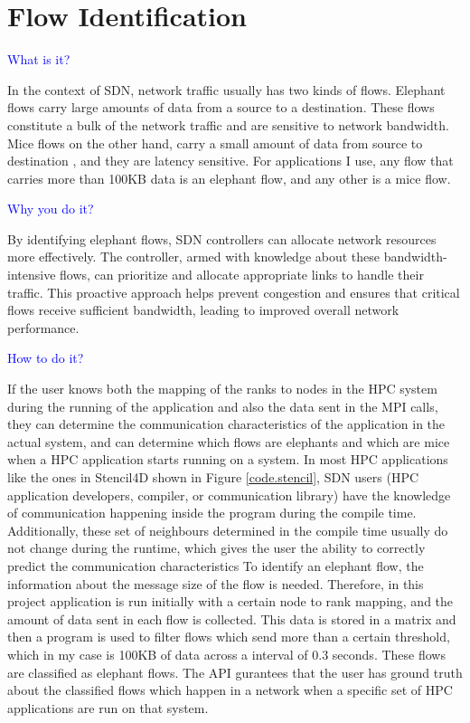 \section{Flow Identification}

\textcolor{blue}{What is it?}

In the context of SDN, network traffic usually has two kinds of flows. Elephant flows 
carry large amounts of data from a source to a destination. These flows
constitute a bulk of the network traffic and are sensitive to network bandwidth.
Mice flows on the other hand, carry a small amount of data from source to
destination \cite{yang2020flow, afek2015sampling}, and they are latency sensitive. For
applications I use, any flow that carries more than 100KB data is an elephant flow, and any other is a
mice flow.


\textcolor{blue}{Why you do it?}

By identifying elephant flows, SDN controllers can allocate network resources more effectively. The controller, armed with knowledge about these bandwidth-intensive flows, can prioritize and allocate appropriate links to handle their traffic. This proactive approach helps prevent congestion and ensures that critical flows receive sufficient bandwidth, leading to improved overall network performance.

\textcolor{blue}{How to do it?}

If the user knows
both the mapping of the ranks to nodes in the HPC system during the running of the
application and also the data sent in the MPI calls, they can determine the
communication characteristics of the application in the actual system, and can
determine which flows are elephants and which are mice when a HPC application
starts running on a system. 
In most HPC applications like the ones in Stencil4D shown in Figure \ref{code.stencil}, SDN
users (HPC application developers, compiler, or communication library) have the
knowledge of communication happening inside the program during the compile time.
Additionally, these set of neighbours determined in the compile time usually 
do not change during the runtime, which gives the user the
ability to correctly predict the communication characteristics 
To identify an elephant flow, the information about the message size of the
flow is needed. Therefore, in this project application is run initially with a certain node to rank mapping, and the
amount of data sent in each flow is collected. This data is stored in a matrix and then a program is used to filter
flows which send more than a certain threshold, which in my case is 100KB of data across a interval of 0.3 seconds.  
These flows are classified as elephant flows. The API gurantees that the user has ground truth about
the classified flows which happen in a network when a specific set of HPC applications are run on that 
system.

